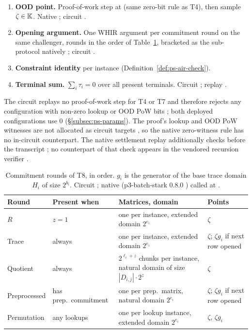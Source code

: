 \begin{enumerate}
  .
\item[T7.] \textbf{OOD point.} Proof-of-work step at  (same
  zero-bit rule as T4), then sample $\zeta \in \mathbb{K}$. Native
  ; circuit .
\item[T8.] \textbf{Opening argument.} One WHIR argument per commitment round on the
  same challenger, rounds in the order of Table~\ref{tab:ps-rounds}, bracketed as
  the  sub-protocol natively ;
  circuit .
\item[T9.] \textbf{Constraint identity} per instance (Definition~\ref{def:ps-air-check}).
\item[T10.] \textbf{Terminal sum.} $\sum_i \tau_i = 0$ over all present terminals.
  Circuit 
  ; replay
  .
\end{enumerate}

The circuit replays no proof-of-work step for T4 or T7 and therefore rejects any
configuration with non-zero lookup or OOD PoW bits ;
both deployed configurations use $0$ (\S\ref{subsec:ps-params}). The proof's
lookup and OOD PoW witnesses are not allocated as circuit targets
, so the native
zero-witness rule has no in-circuit counterpart. The native settlement replay
additionally checks  before the
transcript ; no counterpart of that check
appears in the vendored recursion verifier .

\begin{table}[h]
\centering
\small
\begin{tabularx}{\linewidth}{@{}l l X l@{}}
\toprule
Round & Present when & Matrices, domain & Points \\
\midrule
$R$ & $z=1$ & one per instance, extended domain $2^{e_i}$ & $\zeta$ \\
Trace & always & one per instance, extended domain $2^{e_i}$ & $\zeta$; $\zeta g_i$ if next row opened \\
Quotient & always & $2^{\ell_i+z}$ chunks per instance, natural domain of size $|D_{i,j}|\cdot 2^{z}$ & $\zeta$ \\
Preprocessed & has prep.\ commitment & one per prep.\ matrix, natural domain $2^{e_i}$ & $\zeta$; $\zeta g_i$ if next row opened \\
Permutation & any lookups & one per lookup instance, extended domain $2^{e_i}$ & $\zeta$, $\zeta g_i$ \\
\bottomrule
\end{tabularx}
\caption{Commitment rounds of T8, in order. $g_i$ is the generator of the base
trace domain $H_i$ of size $2^{b_i}$. Circuit
\protect{}; native
 (p3-batch-stark 0.8.0
\protect{}) called at
\protect{}.}
\label{tab:ps-rounds}
\end{table}

